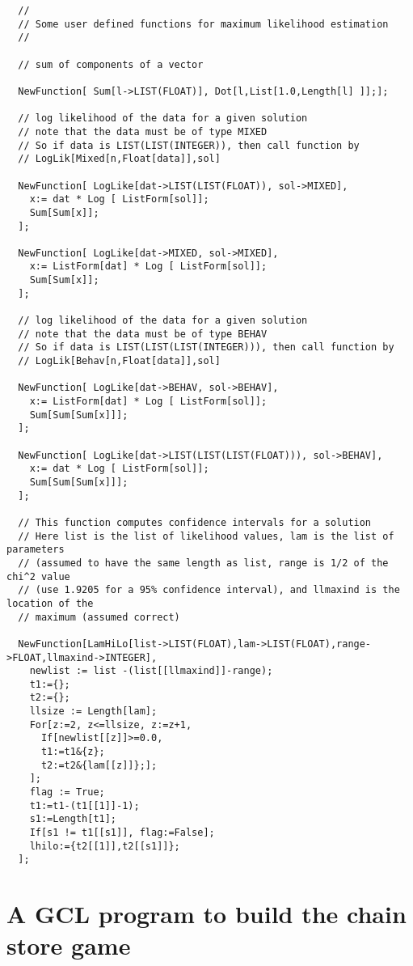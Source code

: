 {\scriptsize
\begin{verbatim}
  //
  // Some user defined functions for maximum likelihood estimation
  // 

  // sum of components of a vector

  NewFunction[ Sum[l->LIST(FLOAT)], Dot[l,List[1.0,Length[l] ]];];

  // log likelihood of the data for a given solution
  // note that the data must be of type MIXED
  // So if data is LIST(LIST(INTEGER)), then call function by  
  // LogLik[Mixed[n,Float[data]],sol]

  NewFunction[ LogLike[dat->LIST(LIST(FLOAT)), sol->MIXED], 
    x:= dat * Log [ ListForm[sol]];
    Sum[Sum[x]];
  ];

  NewFunction[ LogLike[dat->MIXED, sol->MIXED], 
    x:= ListForm[dat] * Log [ ListForm[sol]];
    Sum[Sum[x]];
  ];

  // log likelihood of the data for a given solution
  // note that the data must be of type BEHAV
  // So if data is LIST(LIST(LIST(INTEGER))), then call function by  
  // LogLik[Behav[n,Float[data]],sol]

  NewFunction[ LogLike[dat->BEHAV, sol->BEHAV], 
    x:= ListForm[dat] * Log [ ListForm[sol]];
    Sum[Sum[Sum[x]]];
  ];

  NewFunction[ LogLike[dat->LIST(LIST(LIST(FLOAT))), sol->BEHAV], 
    x:= dat * Log [ ListForm[sol]];
    Sum[Sum[Sum[x]]];
  ];

  // This function computes confidence intervals for a solution
  // Here list is the list of likelihood values, lam is the list of parameters
  // (assumed to have the same length as list, range is 1/2 of the chi^2 value
  // (use 1.9205 for a 95% confidence interval), and llmaxind is the location of the 
  // maximum (assumed correct) 

  NewFunction[LamHiLo[list->LIST(FLOAT),lam->LIST(FLOAT),range->FLOAT,llmaxind->INTEGER], 
    newlist := list -(list[[llmaxind]]-range);
    t1:={};
    t2:={};
    llsize := Length[lam];
    For[z:=2, z<=llsize, z:=z+1,
      If[newlist[[z]]>=0.0, 
      t1:=t1&{z}; 
      t2:=t2&{lam[[z]]};];
    ];
    flag := True;
    t1:=t1-(t1[[1]]-1);
    s1:=Length[t1];
    If[s1 != t1[[s1]], flag:=False];
    lhilo:={t2[[1]],t2[[s1]]};
  ];
\end{verbatim}
}






\newpage
\section{A GCL program to build the chain store game}

